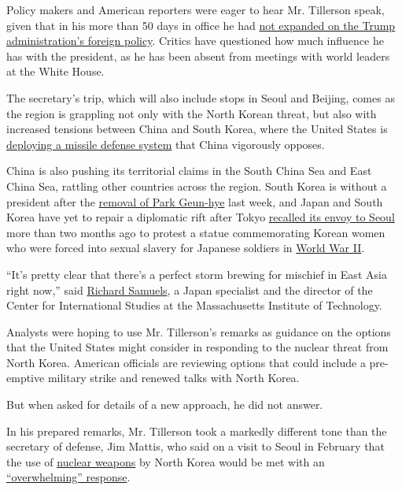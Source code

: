 Policy makers and American reporters were eager to hear Mr. Tillerson
speak, given that in his more than 50 days in office he had
\href{https://www.nytimes.com/2017/03/11/us/politics/rex-tillerson-trump-white-house.html?_r=0}{not
expanded on the Trump administration's foreign policy}. Critics have
questioned how much influence he has with the president, as he has been
absent from meetings with world leaders at the White House.

The secretary's trip, which will also include stops in Seoul and
Beijing, comes as the region is grappling not only with the North Korean
threat, but also with increased tensions between China and South Korea,
where the United States is
\href{https://www.nytimes.com/2017/03/06/world/asia/north-korea-thaad-missile-defense-us-china.html}{deploying
a missile defense system} that China vigorously opposes.

China is also pushing its territorial claims in the South China Sea and
East China Sea, rattling other countries across the region. South Korea
is without a president after the
\href{https://www.nytimes.com/2017/03/09/world/asia/park-geun-hye-impeached-south-korea.html}{removal
of Park Geun-hye} last week, and Japan and South Korea have yet to
repair a diplomatic rift after Tokyo
\href{https://www.nytimes.com/2017/01/06/world/asia/japan-south-korea-ambassador-comfort-woman-statue.html}{recalled
its envoy to Seoul} more than two months ago to protest a statue
commemorating Korean women who were forced into sexual slavery for
Japanese soldiers in
\href{http://topics.nytimes.com/top/reference/timestopics/subjects/w/world_war_ii_/index.html?inline=nyt-classifier}{World
War II}.

``It's pretty clear that there's a perfect storm brewing for mischief in
East Asia right now,'' said
\href{http://web.mit.edu/polisci/people/faculty/richard-samuels.html}{Richard
Samuels}, a Japan specialist and the director of the Center for
International Studies at the Massachusetts Institute of Technology.

Analysts were hoping to use Mr. Tillerson's remarks as guidance on the
options that the United States might consider in responding to the
nuclear threat from North Korea. American officials are reviewing
options that could include a pre-emptive military strike and renewed
talks with North Korea.

But when asked for details of a new approach, he did not answer.

In his prepared remarks, Mr. Tillerson took a markedly different tone
than the secretary of defense, Jim Mattis, who said on a visit to Seoul
in February that the use of
\href{http://topics.nytimes.com/top/news/science/topics/atomic_weapons/index.html?inline=nyt-classifier}{nuclear
weapons} by North Korea would be met with an
\href{https://www.nytimes.com/2017/02/05/us/politics/jim-mattis-south-korea-japan.html}{``overwhelming''
response}.

